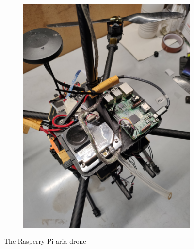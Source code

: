 \begin{figure}[!ht]
\begin{subfigure}[b]{0.32\textwidth}
        \includegraphics[width=\textwidth, angle=-90]{images/drone/IMG_20211105_103839.jpg}
        \caption{}
        \label{fig:rasp}
    \end{subfigure}
       \caption{The Rasperry Pi \gls{aria} drone}
       \label{fig:system}
\end{figure}
